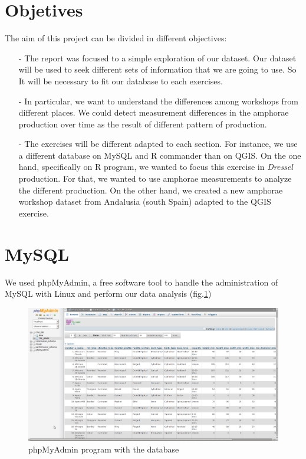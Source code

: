 \documentclass[10pt,a4paper]{article}
\begin{document}
\section{Objetives}

The aim of this project can be divided in different objectives: 

\begin{itemize}
\item[-] The report was focused to a simple exploration of our dataset. Our dataset will be used to seek different sets of information that we are going to use. So It will be necessary to fit our database to each exercises. 
\item[-] In particular, we want to understand the differences among workshops from different places. We could detect measurement differences in the amphorae production over time as the result of different pattern of production. 
\item[-] The exercises will be different adapted to each section. For instance, we use a different database on MySQL and R commander than on QGIS. On the one hand, specifically on R program, we wanted to focus this exercise in \textit{Dressel} production. For that, we wanted to use amphorae measurements to analyze the different production. On the other hand, we created a new amphorae workshop dataset from Andalusia (south Spain) adapted to the QGIS exercise. 

\end{itemize}


\section{MySQL}

We used phpMyAdmin, a free software tool to handle the administration of MySQL  with Linux and perform our data analysis (fig.\ref{myphp})

\begin{figure}[htp]
	\centering
\includegraphics[scale=0.25]{picture2.png}
\caption{phpMyAdmin program with the database}
\label{myphp}
\end{figure} 
\end{document}
